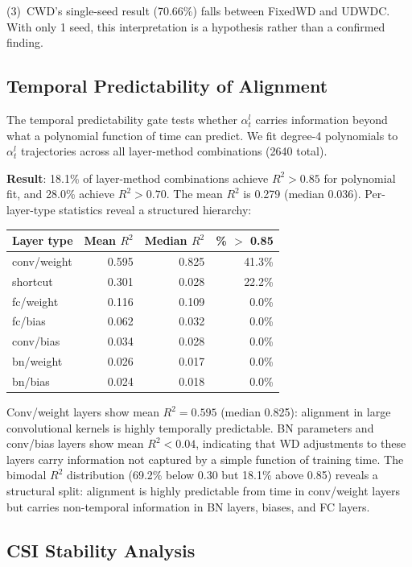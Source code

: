 \documentclass{article}
\begin{document}
(3)~CWD's single-seed result (70.66\%) falls between FixedWD and UDWDC. With only 1 seed, this interpretation is a hypothesis rather than a confirmed finding.

\subsection{Temporal Predictability of Alignment}

The temporal predictability gate tests whether $\alpha_t^l$ carries information beyond what a polynomial function of time can predict. We fit degree-4 polynomials to $\alpha_t^l$ trajectories across all layer-method combinations (2640 total).

\textbf{Result}: 18.1\% of layer-method combinations achieve $R^2 > 0.85$ for polynomial fit, and 28.0\% achieve $R^2 > 0.70$. The mean $R^2$ is 0.279 (median 0.036). Per-layer-type statistics reveal a structured hierarchy:

\begin{table}[h]
\centering
\small
\begin{tabular}{lrrr}
\toprule
Layer type & Mean $R^2$ & Median $R^2$ & \% $>$ 0.85 \\
\midrule
conv/weight & 0.595 & 0.825 & 41.3\% \\
shortcut & 0.301 & 0.028 & 22.2\% \\
fc/weight & 0.116 & 0.109 & 0.0\% \\
fc/bias & 0.062 & 0.032 & 0.0\% \\
conv/bias & 0.034 & 0.028 & 0.0\% \\
bn/weight & 0.026 & 0.017 & 0.0\% \\
bn/bias & 0.024 & 0.018 & 0.0\% \\
\bottomrule
\end{tabular}
\end{table}

Conv/weight layers show mean $R^2 = 0.595$ (median 0.825): alignment in large convolutional kernels is highly temporally predictable. BN parameters and conv/bias layers show mean $R^2 < 0.04$, indicating that WD adjustments to these layers carry information not captured by a simple function of training time. The bimodal $R^2$ distribution (69.2\% below 0.30 but 18.1\% above 0.85) reveals a structural split: alignment is highly predictable from time in conv/weight layers but carries non-temporal information in BN layers, biases, and FC layers.

\subsection{CSI Stability Analysis}
\label{sec:csi}
\end{document}
